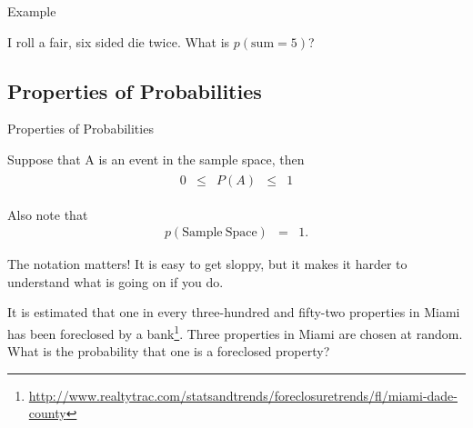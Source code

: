 \begin{frame}{Example}

  I roll a fair, six sided die twice. What is $p(\mathrm{sum}=5)$?
  
\end{frame}


\subsection{Properties of Probabilities}

\begin{frame}{Properties of Probabilities}

  Suppose that A is an event in the sample space, then
  \begin{eqnarray*}
    \begin{array}{rcccl}
      0 & \leq & P(A) & \leq & 1
    \end{array}
  \end{eqnarray*}

  Also note that
  \begin{eqnarray*}
    p(\mathrm{Sample~Space}) & = & 1.
  \end{eqnarray*}

  The notation matters! It is easy to get sloppy, but it makes it
  harder to understand what is going on if you do.
  
\end{frame}


\begin{frame}{}

  It is estimated that one in every three-hundred and fifty-two
  properties in Miami has been foreclosed by a
  bank\footnote{\url{http://www.realtytrac.com/statsandtrends/foreclosuretrends/fl/miami-dade-county}}. Three
  properties in Miami are chosen at random. What is the probability
  that one is a foreclosed property?

  \vfill
  
\end{frame}


